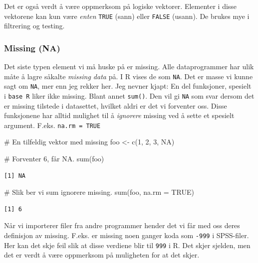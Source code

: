 \documentclass[
  letterpaper,
  DIV=11,
  numbers=noendperiod]{scrartcl}
\newenvironment{Shaded}{\begin{snugshade}}{\end{snugshade}}
\newcommand{\AttributeTok}[1]{\textcolor[rgb]{0.40,0.45,0.13}{#1}}
\newcommand{\CommentTok}[1]{\textcolor[rgb]{0.37,0.37,0.37}{#1}}
\newcommand{\ConstantTok}[1]{\textcolor[rgb]{0.56,0.35,0.01}{#1}}
\newcommand{\DecValTok}[1]{\textcolor[rgb]{0.68,0.00,0.00}{#1}}
\newcommand{\FunctionTok}[1]{\textcolor[rgb]{0.28,0.35,0.67}{#1}}
\newcommand{\NormalTok}[1]{\textcolor[rgb]{0.00,0.23,0.31}{#1}}
\newcommand{\OtherTok}[1]{\textcolor[rgb]{0.00,0.23,0.31}{#1}}
\begin{document}
Det er også verdt å være oppmerksom på logiske vektorer. Elementer i
disse vektorene kan kun være \emph{enten} \texttt{TRUE} (sann) eller
\texttt{FALSE} (usann). De brukes mye i filtrering og testing.

\hypertarget{missing-na}{%
\subsubsection{Missing (NA)}\label{missing-na}}

Det siste typen element vi må huske på er missing. Alle dataprogrammer
har ulik måte å lagre såkalte \emph{missing data} på. I R vises de som
\texttt{NA}. Det er masse vi kunne sagt om \texttt{NA}, mer enn jeg
rekker her. Jeg nevner kjapt: En del funksjoner, spesielt i
\texttt{base\ R} liker ikke missing. Blant annet \texttt{sum()}. Den vil
gi \texttt{NA} som svar dersom det er missing tilstede i datasettet,
hvilket aldri er det vi forventer oss. Disse funksjonene har alltid
mulighet til å \emph{ignorere} missing ved å sette et spesielt argument.
F.eks. \texttt{na.rm\ =\ TRUE}

\begin{Shaded}
\begin{Highlighting}[]
\CommentTok{\# En tilfeldig vektor med missing}
\NormalTok{foo }\OtherTok{\textless{}{-}} \FunctionTok{c}\NormalTok{(}\DecValTok{1}\NormalTok{, }\DecValTok{2}\NormalTok{, }\DecValTok{3}\NormalTok{, }\ConstantTok{NA}\NormalTok{)}

\CommentTok{\# Forventer 6, får NA.}
\FunctionTok{sum}\NormalTok{(foo)}
\end{Highlighting}
\end{Shaded}

\begin{verbatim}
[1] NA
\end{verbatim}

\begin{Shaded}
\begin{Highlighting}[]
\CommentTok{\# Slik ber vi sum ignorere missing.}
\FunctionTok{sum}\NormalTok{(foo, }\AttributeTok{na.rm =} \ConstantTok{TRUE}\NormalTok{)}
\end{Highlighting}
\end{Shaded}

\begin{verbatim}
[1] 6
\end{verbatim}

Når vi importerer filer fra andre programmer hender det vi får med oss
deres definisjon av missing. F.eks. er missing noen ganger koda som
\texttt{-999} i SPSS-filer. Her kan det skje feil slik at disse verdiene
blir til \texttt{999} i R. Det skjer sjelden, men det er verdt å være
oppmerksom på muligheten for at det skjer.
\end{document}
